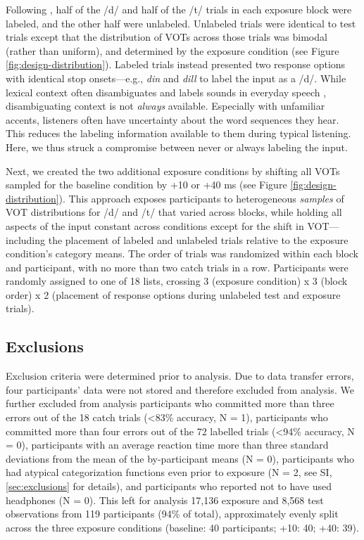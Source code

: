 \documentclass[
  11pt,
  man,mask,floatsintext]{apa6}
\begin{document}
Following \textcite{kleinschmidt2015}, half of the /d/ and half of the /t/ trials in each exposure block were labeled, and the other half were unlabeled. Unlabeled trials were identical to test trials except that the distribution of VOTs across those trials was bimodal (rather than uniform), and determined by the exposure condition (see Figure \ref{fig:design-distribution}). Labeled trials instead presented two response options with identical stop onsets---e.g., \emph{din} and \emph{dill} to label the input as a /d/. While lexical context often disambiguates and labels sounds in everyday speech \autocites[facilitating adaptation,][]{burchill2023,burchill2018}, disambiguating context is not \emph{always} available. Especially with unfamiliar accents, listeners often have uncertainty about the word sequences they hear. This reduces the labeling information available to them during typical listening. Here, we thus struck a compromise between never or always labeling the input.

Next, we created the two additional exposure conditions by shifting all VOTs sampled for the baseline condition by +10 or +40 ms (see Figure \ref{fig:design-distribution}). This approach exposes participants to heterogeneous \emph{samples} of VOT distributions for /d/ and /t/ that varied across blocks, while holding all aspects of the input constant across conditions except for the shift in VOT---including the placement of labeled and unlabeled trials relative to the exposure condition's category means. The order of trials was randomized within each block and participant, with no more than two catch trials in a row. Participants were randomly assigned to one of 18 lists, crossing 3 (exposure condition) x 3 (block order) x 2 (placement of response options during unlabeled test and exposure trials).

\subsection{Exclusions}\label{exclusions}

Exclusion criteria were determined prior to analysis. Due to data transfer errors, four participants' data were not stored and therefore excluded from analysis. We further excluded from analysis participants who committed more than three errors out of the 18 catch trials (\textless83\% accuracy, N = 1), participants who committed more than four errors out of the 72 labelled trials (\textless94\% accuracy, N = 0), participants with an average reaction time more than three standard deviations from the mean of the by-participant means (N = 0), participants who had atypical categorization functions even prior to exposure (N = 2, see SI, \ref{sec:exclusions} for details), and participants who reported not to have used headphones (N = 0). This left for analysis 17,136 exposure and 8,568 test observations from 119 participants (94\% of total), approximately evenly split across the three exposure conditions (baseline: 40 participants; +10: 40; +40: 39).
\end{document}
